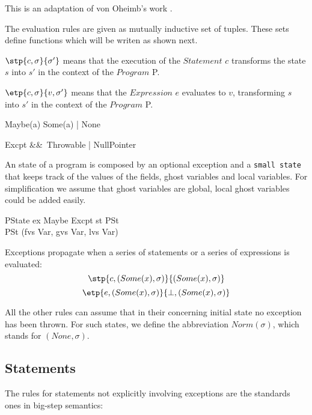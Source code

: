 This is an adaptation of von Oheimb's work \cite{Oheimb-Nipkow-Java-LNCS}.

The evaluation rules are given as mutually inductive set of tuples. These sets define functions which will
be writen as shown next.
\begin{list}{--}{}
  \item $\stp{c,\sigma}{\sigma'}$  means that the execution of the $Statement$ $c$ transforms the state
$s$ into $s'$ in the context of the $Program$ P.
  \item $\etp{c,\sigma}{v,\sigma'}$  means that the $Expression$ $e$ evaluates to $v$, transforming
$s$ into $s'$ in the context of the $Program$ P.
\end{list}

\begin{haskell}
 Maybe(a) \eqdef Some(a) | None
\end{haskell}

\begin{haskell}
Excpt &\eqdef&\, Throwable | NullPointer
\end{haskell}

An state of a program is composed by an optional exception and a \texttt{small state} that keeps track of the
values of the fields, ghost variables and local variables. For simplification we assume that ghost variables
are global, local ghost variables could be added easily.
\begin{haskell}
PState \eqdef ex \gcolon Maybe Excpt \times st \gcolon PSt\\
PSt \eqdef (fvs \gcolon Var, gvs \gcolon Var, lvs \gcolon Var)\\
\end{haskell}

Exceptions propagate when a series of statements or a series of expressions is evaluated:
$$\stp{c,(Some(x), \sigma)}{(Some(x), \sigma)}$$
$$\etp{e,(Some(x), \sigma)}{\bot, (Some(x), \sigma)}$$

All the other rules can assume that in their concerning initial state no exception has been thrown. For such
states, we define the abbreviation $Norm(\sigma)$, which stands for $(None, \sigma)$.

\subsection*{Statements}
The rules for statements not explicitly involving exceptions are the standards ones in big-step semantics:

